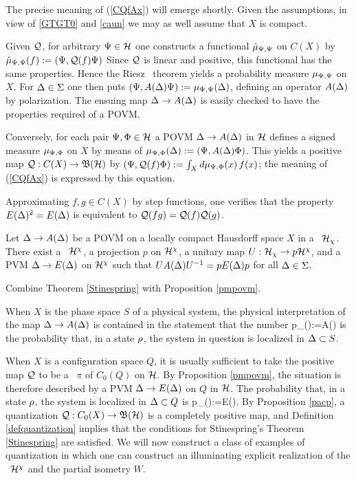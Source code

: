 The precise meaning of (\ref{CQfAx}) will emerge shortly.
Given the assumptions, in view of \ref{GTGT0} and \ref{caun}
we may as well assume that $X$ is compact.

Given ${\cal Q}$, for arbitrary $\Psi\in {\cal H}$ one constructs a 
functional $\hat{\mu}_{\Psi,\Psi}$ on $C(X)$ by
$\hat{\mu}_{\Psi,\Psi}(f):=(\Psi,{\cal Q}(f)\Psi)$
Since ${\cal Q}$ is linear and  positive, this functional has the same properties.
Hence the Riesz \rep\ theorem yields a probability 
measure $\mu_{\Psi,\Psi}$ on $X$.
For $\Delta\in\Sigma$ one then puts
$(\Psi,A(\Delta)\Psi):=\mu_{\Psi,\Psi}(\Delta)$,  defining an operator
$A(\Delta)$ by polarization. The ensuing map $\Delta \rightarrow A(\Delta)$
is easily checked to have the properties required of a POVM.

Conversely, for each pair $\Psi,\Phi\in{\cal H}$
a POVM $\Delta\rightarrow A(\Delta)$ in ${\cal H}$ defines 
a signed measure $\mu_{\Psi,\Phi}$ on $X$  by
means of $\mu_{\Psi,\Phi}(\Delta):=(\Psi,A(\Delta)\Phi)$. This yields 
a positive map ${\cal Q}:C(X)\rightarrow{\frak B}({\cal H})$ by 
$(\Psi,{\cal Q}(f)\Phi):=\int_X d\mu_{\Psi,\Phi}(x)\, f(x)$;  the 
 meaning of (\ref{CQfAx}) is expressed by this equation.

Approximating $f,g\in C(X)$ by step functions, one verifies that
the property $E(\Delta)^2=E(\Delta)$ is equivalent to ${\cal Q}(fg)={\cal Q}(f){\cal Q}(g)$.
\enp
\begin{Corollary}
Let $\Delta\rightarrow A(\Delta)$ be a POVM on a locally compact Hausdorff space
$X$ in a \Hs\ ${\cal H}_{\chi}$. There exist a \Hs\ ${\cal H}^{\chi}$, a projection $p$
on ${\cal H}^{\chi}$, a unitary map $U:{\cal H}_{\chi}\rightarrow p{\cal H}^{\chi}$, and a PVM $\Delta\rightarrow E(\Delta)$ 
on ${\cal H}^{\chi}$ such that $UA(\Delta)U^{-1}=pE(\Delta)p$ for all $\Delta\in\Sigma$.
\end{Corollary}

Combine Theorem \ref{Stinespring} with Proposition \ref{pmpovm}. \enp

When  $X$ is the phase space $S$ of a physical system, the physical interpretation of the map
$\Delta\rightarrow A(\Delta)$ is  contained in the statement that the number
\be
p_{\rh}(\Dl):=\Tr \rh A(\Dl) 
\ee
is the probability that, in a state $\rho$,
the system in question is localized in $\Delta\subset S$.
 
When $X$ is a configuration space $Q$, it is usually sufficient to
take the positive map ${\cal Q}$ to be a \rep\ $\pi$ of $C_0(Q)$ on
${\cal H}$. By Proposition \ref{pmpovm}, the situation is therefore
described by a PVM $\Delta\rightarrow E(\Delta)$ on $Q$ in ${\cal H}$.  The probability
that, in a state $\rho$, the system is localized in $\Delta\subset Q$ is
\be p_{\rh}(\Dl):=\Tr \rh E(\Dl).  \ee {} By Proposition \ref{pacp}, a quantization
${\cal Q}:C_0(X)\rightarrow{\frak B}({\cal H})$ is a completely positive map, and Definition
\ref{defquantization} implies that the conditions for Stinespring's
Theorem \ref{Stinespring} are satisfied. We will now construct a class
of examples of quantization in which one can construct an illuminating
explicit realization of the \Hs\ ${\cal H}^{\chi}$ and the partial isometry $W$.


